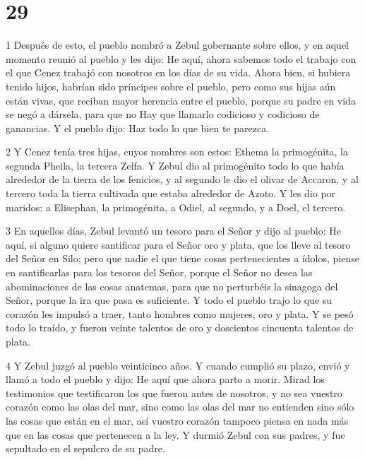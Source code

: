 \chapter{29}

\par 1 Después de esto, el pueblo nombró a Zebul gobernante sobre ellos, y en aquel momento reunió al pueblo y les dijo: He aquí, ahora sabemos todo el trabajo con el que Cenez trabajó con nosotros en los días de su vida. Ahora bien, si hubiera tenido hijos, habrían sido príncipes sobre el pueblo, pero como sus hijas aún están vivas, que reciban mayor herencia entre el pueblo, porque su padre en vida se negó a dársela, para que no Hay que llamarlo codicioso y codicioso de ganancias. Y el pueblo dijo: Haz todo lo que bien te parezca.

\par 2 Y Cenez tenía tres hijas, cuyos nombres son estos: Ethema la primogénita, la segunda Pheila, la tercera Zelfa. Y Zebul dio al primogénito todo lo que había alrededor de la tierra de los fenicios, y al segundo le dio el olivar de Accaron, y al tercero toda la tierra cultivada que estaba alrededor de Azoto. Y les dio por maridos: a Elisephan, la primogénita, a Odiel, al segundo, y a Doel, el tercero.

\par 3 En aquellos días, Zebul levantó un tesoro para el Señor y dijo al pueblo: He aquí, si alguno quiere santificar para el Señor oro y plata, que los lleve al tesoro del Señor en Silo; pero que nadie el que tiene cosas pertenecientes a ídolos, piense en santificarlas para los tesoros del Señor, porque el Señor no desea las abominaciones de las cosas anatemas, para que no perturbéis la sinagoga del Señor, porque la ira que pasa es suficiente. Y todo el pueblo trajo lo que su corazón les impulsó a traer, tanto hombres como mujeres, oro y plata. Y se pesó todo lo traído, y fueron veinte talentos de oro y doscientos cincuenta talentos de plata.

\par 4 Y Zebul juzgó al pueblo veinticinco años. Y cuando cumplió su plazo, envió y llamó a todo el pueblo y dijo: He aquí que ahora parto a morir. Mirad los testimonios que testificaron los que fueron antes de nosotros, y no sea vuestro corazón como las olas del mar, sino como las olas del mar no entienden sino sólo las cosas que están en el mar, así vuestro corazón tampoco piensa en nada más que en las cosas que pertenecen a la ley. Y durmió Zebul con sus padres, y fue sepultado en el sepulcro de su padre.

